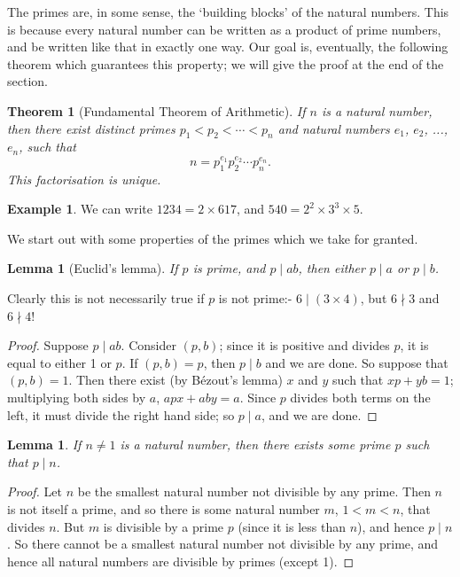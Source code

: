 \documentclass[a4paper,leqno]{article}
\numberwithin{equation}{section}
\newtheorem{thm}[equation]{Theorem}
\newtheorem{lem}[equation]{Lemma}
\theoremstyle{definition}
\newtheorem{ex}[equation]{Example}
\theoremstyle{remark}
\begin{document}
The primes are, in some sense, the `building blocks' of the natural numbers. This is because every natural number can
be written as a product of prime numbers, and be written like that in exactly one way. Our goal is, eventually, the
following theorem which guarantees this property; we will give the proof at the end of the section.
\begin{thm}[Fundamental Theorem of Arithmetic]\label{thm:funarithmetic}
  If $ n $ is a natural number, then there exist distinct primes $ p_1 < p_2 < \cdots < p_n $ and natural
  numbers $ e_1 $, $ e_2 $, ..., $ e_n $, such that
  \begin{displaymath}
    n = p_1^{e_1} p_2^{e_2} \cdots p_n^{e_n}.
  \end{displaymath}
  This factorisation is unique.
\end{thm}

\begin{ex}
  We can write $ 1234 = 2 \times 617 $, and $ 540 = 2^2 \times 3^3 \times 5 $.
\end{ex}

We start out with some properties of the primes which we take for granted.
\begin{lem}[Euclid's lemma]
  If $ p $ is prime, and $ p \mid ab $, then either $ p \mid a $ or $ p \mid b $.
\end{lem}
Clearly this is not necessarily true if $ p $ is not prime:- $ 6 \mid (3 \times 4) $, but $ 6 \nmid 3 $ and $ 6 \nmid 4 $!
\begin{proof}
  Suppose $ p \mid ab $. Consider $ (p,b) $; since it is positive and divides $ p $, it is equal to either 1
  or $ p $. If $ (p,b) = p $, then $ p \mid b $ and we are done. So suppose that $ (p,b) = 1 $. Then there exist (by B\'ezout's
  lemma) $ x $ and $ y $ such that $ xp + yb = 1 $; multiplying both sides by $ a $, $ apx + aby = a $. Since $ p $ divides both
  terms on the left, it must divide the right hand side; so $ p \mid a $, and we are done.
\end{proof}

\begin{lem}
  If $ n \neq 1 $ is a natural number, then there exists some prime $ p $ such that $ p \mid n $.
\end{lem}
\begin{proof}
  Let $ n $ be the smallest natural number not divisible by any prime. Then $ n $ is not itself a prime,
  and so there is some natural number $ m $, $ 1 < m < n $, that divides $ n $. But $ m $ is divisible by
  a prime $ p $ (since it is less than $ n $), and hence $ p \mid n $. So there cannot be a smallest natural
  number not divisible by any prime, and hence all natural numbers are divisible by primes (except 1).
\end{proof}
\end{document}
